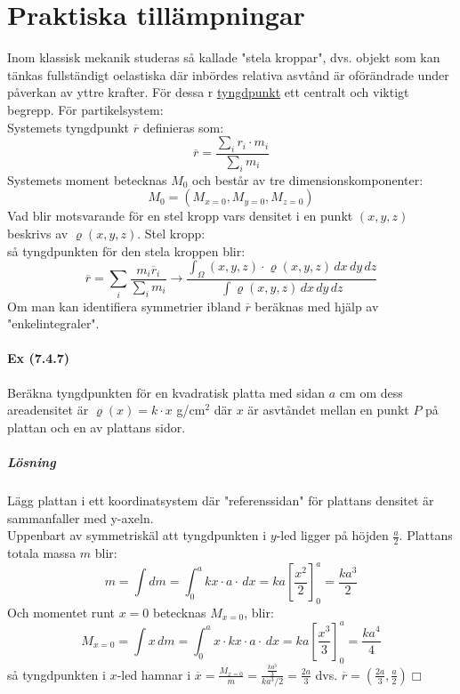 \section{Praktiska tillämpningar}
Inom klassisk mekanik studeras så kallade "stela kroppar", dvs. objekt som kan tänkas fullständigt oelastiska där inbördes relativa asvtånd är oförändrade under påverkan av yttre krafter.
För dessa r \underline{tyngdpunkt} ett centralt och viktigt begrepp.
För partikelsystem:\\
Systemets tyngdpunkt $\overline{r}$ definieras som:
\begin{equation*}
    \overline{r}=\frac{\sum_i r_i\cdot m_i}{\sum_i m_i}
\end{equation*}
Systemets moment betecknas $M_0$ och består av tre dimensionskomponenter:
\begin{equation*}
    M_0=(M_{x=0},M_{y=0},M_{z=0})
\end{equation*}
Vad blir motsvarande för en stel kropp vars densitet i en punkt $(x,y,z)$ beskrivs av $\varrho (x,y,z)$.
Stel kropp:\\
så tyngdpunkten för den stela kroppen blir:
\begin{equation*}
    \overline{r}=
    \sum_i \frac{m_i \overline{r}_i}{\sum_i m_i}\to
    \frac{\int_\Omega (x,y,z)\cdot\varrho(x,y,z)\, dx\, dy\, dz}{\int \varrho(x,y,z)\, dx\, dy\, dz}
\end{equation*}
Om man kan identifiera symmetrier ibland $\overline{r}$ beräknas med hjälp av "enkelintegraler".

\paragraph{Ex (7.4.7)} Beräkna tyngdpunkten för en kvadratisk platta med sidan $a$ cm om dess areadensitet är $\varrho(x)=k\cdot x$ g/cm$^2$ där $x$ är asvtåndet mellan en punkt $P$ på plattan och en av plattans sidor.
\subparagraph{Lösning}
Lägg plattan i ett koordinatsystem där "referenssidan" för plattans densitet är sammanfaller med y-axeln.\\
Uppenbart av symmetriskäl att tyngdpunkten i $y$-led ligger på höjden $\frac{a}{2}$.
Plattans totala massa $m$ blir:
\begin{equation*}
    m=\int dm=\int_0^a kx\cdot a\cdot\, dx=ka[\frac{x^2}{2}]_0^a=\frac{ka^3}{2}
\end{equation*}
Och momentet runt $x=0$ betecknas $M_{x=0}$, blir:
\begin{equation*}
    M_{x=0}=\int x\, dm=\int_0^a x\cdot kx\cdot a\cdot\, dx=ka[\frac{x^3}{3}]_0^a=\frac{ka^4}{4}
\end{equation*}
så tyngdpunkten i $x$-led hamnar i $\overline{x}=\frac{M_{x=0}}{m}=\frac{\frac{ka^3}{3}}{ka^3/2}=\frac{2a}{3}$
dvs. $\overline{r}=(\frac{2a}{3},\frac{a}{2}) \Box$


